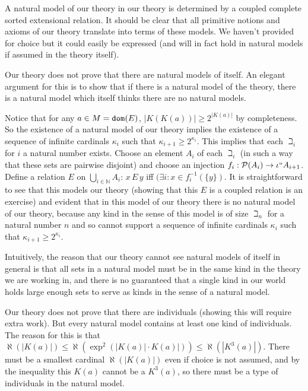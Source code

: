 \documentclass[12pt]{article}
\begin{document}
A natural model of our theory in our theory is determined by a coupled complete sorted extensional relation.  It should be clear that all primitive notions and axioms of our theory translate into terms of these models.  We haven't provided for choice but it could easily be expressed (and will in fact hold in natural models if assumed in the theory itself).

Our theory does not prove that there are natural models of itself.  An elegant argument for this is to show that if there is a natural model of the theory, there is a natural model which itself thinks there are no natural models.

Notice that for any $a \in M = {\tt dom}(E)$, $|K(K(a))| \geq 2^{|K(a)|}$ by completeness.  So the existence of a natural model of our theory implies the existence of a sequence of infinite cardinals $\kappa_i$ such that $\kappa_{i+1} \geq 2^{\kappa_i}$.  This implies that each $\beth_i$ for $i$ a natural number exists.
Choose an element $A_i$ of each $\beth_i$ (in such a way that these sets are pairwise disjoint) and choose an injection $f_i:{\cal P}(A_i) \rightarrow \iota``A_{i+1}$.  Define a relation $E$ on $\bigcup_{i \in \mathbb N}A_i$:  $x \,E\,y$ iff $(\exists i:x \in f_{i}^{-1}(\{y\})$.  It is straightforward to see that this models our
theory (showing that this $E$ is a coupled relation is an exercise) and evident that in this model of our theory there is no natural model of our theory, because any kind in the sense of this model is of size $\beth_n$ for a natural number $n$ and so cannot support a sequence of infinite cardinals $\kappa_i$ such that $\kappa_{i+1} \geq 2^{\kappa_i}$. 

Intuitively, the reason that our theory cannot see natural models of itself in general is that all sets in a natural model must be in the same kind in the theory we are working in, and there is no guaranteed that a single kind in our world holds large enough sets to serve as kinds in the sense of a natural model.

Our theory does not prove that there are individuals (showing this will require extra work).  But every natural model contains at least one kind of individuals.  The reason for this is that $\aleph(|K(a)|) \leq \aleph(\exp^2(|K(a)|\cdot K(a)|)) \leq \aleph(|K^3(a)|)$.  There must be a smallest cardinal $\aleph(|K(a)|)$ even if choice is not assumed, and by the inequality
this $K(a)$ cannot be a $K^3(a)$, so there must be a type of individuals in the natural model.
\end{document}

